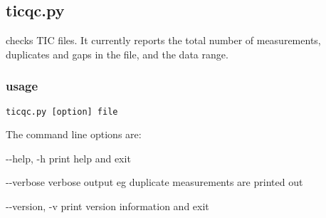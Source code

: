 \subsection{ticqc.py}

\hypertarget{h:ticqc}{}

 checks TIC files. It currently reports the total number of measurements, duplicates and gaps in the file,
and the data range.

\subsubsection{usage}

\begin{lstlisting}[mathescape=true]
ticqc.py [option] file
\end{lstlisting}
The command line options are:
\begin{description*}
\item[-{}-help, -h] print help and exit
\item[-{}-verbose ] verbose output eg duplicate measurements are printed out
\item[-{}-version, -v] print version information and exit
\end{description*}

